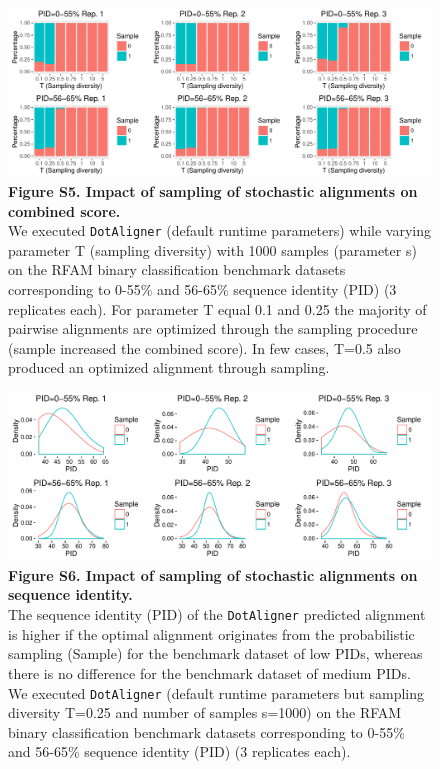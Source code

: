 \documentclass{bmcart}
\newcommand\dotaligner{\texttt{DotAligner}}
\begin{document}
\begin{figure}
 \includegraphics[width=\textwidth]{SF5}
 \caption*{ \textbf{ Figure S5. Impact of sampling of stochastic alignments on combined score.}\\
 We executed \dotaligner{} (default runtime parameters) while varying parameter T (sampling diversity) with 1000 samples (parameter s) on the RFAM binary classification benchmark datasets corresponding to 0-55\% and 56-65\% sequence identity (PID) (3 replicates each). For parameter T equal 0.1 and 0.25 the majority of pairwise alignments are optimized through the sampling procedure (sample increased the combined score). In few cases, T=0.5 also produced an optimized alignment through sampling. 
}
\end{figure}

\begin{figure}
 \includegraphics[width=\textwidth]{SF6}
 \caption*{ \textbf{ Figure S6. Impact of sampling of stochastic alignments on sequence identity.}\\
The sequence identity (PID) of the \dotaligner{} predicted alignment is higher if the optimal alignment originates from the probabilistic sampling (Sample) for the benchmark dataset of low PIDs, whereas there is no difference for the benchmark dataset of medium PIDs. We executed \dotaligner{} (default runtime parameters but sampling diversity T=0.25 and number of samples s=1000) on the RFAM binary classification benchmark datasets corresponding to 0-55\% and 56-65\% sequence identity (PID) (3 replicates each). 
}
\end{figure}
\end{document}
